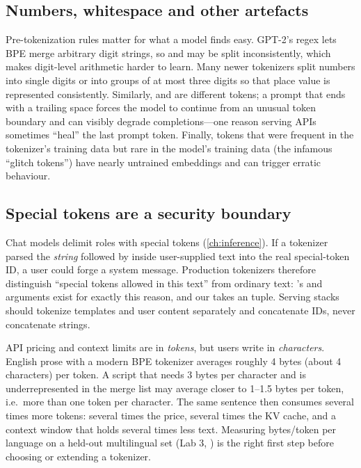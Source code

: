 \subsection{Numbers, whitespace and other artefacts}
Pre-tokenization rules matter for what a model finds easy. GPT-2's regex lets BPE merge arbitrary
digit strings, so  and  may be split inconsistently, which makes
digit-level arithmetic harder to learn. Many newer tokenizers split numbers into single digits or
into groups of at most three digits so that place value is represented consistently. Similarly,
 and  are different tokens; a prompt that ends with a trailing space forces
the model to continue from an unusual token boundary and can visibly degrade completions---one
reason serving APIs sometimes ``heal'' the last prompt token. Finally, tokens that were frequent
in the tokenizer's training data but rare in the model's training data (the infamous ``glitch
tokens'') have nearly untrained embeddings and can trigger erratic behaviour.

\subsection{Special tokens are a security boundary}
Chat models delimit roles with special tokens (\cref{ch:inference}). If a tokenizer parsed the
\emph{string}  followed by  inside user-supplied text into the real special-token ID, a
user could forge a system message. Production tokenizers therefore distinguish ``special tokens
allowed in this text'' from ordinary text: 's  and
 arguments exist for exactly this reason, and our
 takes an  tuple. Serving stacks should
tokenize templates and user content separately and concatenate IDs, never concatenate strings.

\begin{napkinmath}
API pricing and context limits are in \emph{tokens}, but users write in \emph{characters}.
English prose with a modern BPE tokenizer averages roughly 4 bytes (about 4 characters) per token.
A script that needs 3 bytes per character and is underrepresented in the merge list may average
closer to 1--1.5 bytes per token, i.e.\ more than one token per character. The same sentence then
consumes several times more tokens: several times the price, several times the KV cache, and a
context window that holds several times less text. Measuring bytes/token per language on a
held-out multilingual set (Lab 3, ) is the right first step before
choosing or extending a tokenizer.
\end{napkinmath}

